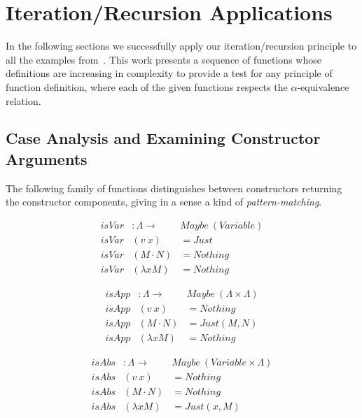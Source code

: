 \documentclass{entcs}
\newcommand{\alp}{\ensuremath{\alpha}}
\begin{document}
\section{Iteration/Recursion Applications}
\label{sec:applications}

In the following sections we successfully apply our iteration/recursion principle to all the examples from~\cite{Norrish04recursivefunction}. This work presents a sequence of functions whose definitions are increasing in complexity to provide a test for any principle of function definition, where each of the given functions respects the \alp-equivalence relation.

\subsection{Case Analysis and Examining Constructor Arguments}
\label{sec:caseanalysis}

The following family of functions distinguishes between constructors returning the constructor components, giving in a sense a kind of \emph{pattern-matching}.

\begin{minipage}{.47\textwidth}
\[\begin{array}{rll}
isVar &: \Lambda \rightarrow& Maybe\ ( Variable ) \\
isVar &(v\ x)         &= Just \\
isVar &(M \cdot N)   &= Nothing \\
isVar &(\lambda x M) &= Nothing
\end{array}\]
\end{minipage}
\begin{minipage}{.47\textwidth}
\[\begin{array}{rll}
isApp &: \Lambda \rightarrow& Maybe\ (\Lambda \times \Lambda) \\
isApp &(v\ x)          &= Nothing \\
isApp &(M \cdot N)   &= Just (M , N) \\
isApp &(\lambda x M) &= Nothing
\end{array}\]
\end{minipage}


\begin{minipage}{.9\textwidth}
\[
\begin{array}{rll}
isAbs &: \Lambda \rightarrow& Maybe\ (Variable \times \Lambda) \\
isAbs &(v\ x)         &= Nothing \\
isAbs &(M \cdot N)   &= Nothing \\
isAbs &(\lambda x M) &= Just (x , M)
\end{array} \]
\end{minipage}
\end{document}
